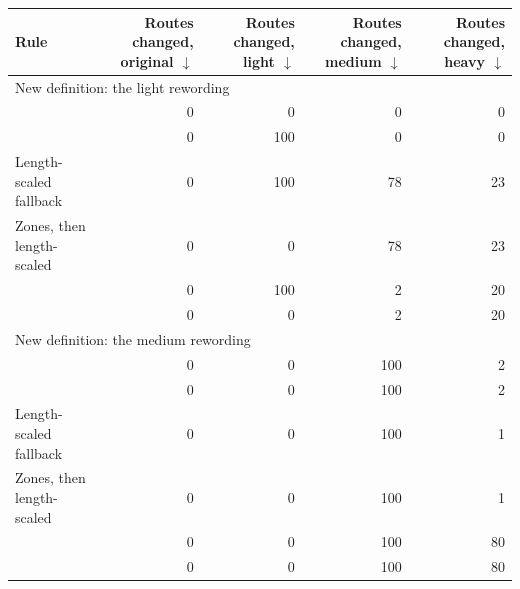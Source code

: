 \begin{tabular}{lrrrr}
    \toprule
    Rule & \shortstack[r]{Routes\\changed,\\original $\downarrow$} & \shortstack[r]{Routes\\changed,\\light $\downarrow$} & \shortstack[r]{Routes\\changed,\\medium $\downarrow$} & \shortstack[r]{Routes\\changed,\\heavy $\downarrow$} \\
    \midrule
    \multicolumn{5}{l}{New definition: the light rewording} \\
    \cert{} & 0 & 0 & 0 & 0 \\
    \nearest{} & 0 & 100 & 0 & 0 \\
    Length-scaled fallback & 0 & 100 & 78 & 23 \\
    Zones, then length-scaled & 0 & 0 & 78 & 23 \\
    \scaled{} & 0 & 100 & 2 & 20 \\
    \certscaled{} & 0 & 0 & 2 & 20 \\
    \midrule
    \multicolumn{5}{l}{New definition: the medium rewording} \\
    \cert{} & 0 & 0 & 100 & 2 \\
    \nearest{} & 0 & 0 & 100 & 2 \\
    Length-scaled fallback & 0 & 0 & 100 & 1 \\
    Zones, then length-scaled & 0 & 0 & 100 & 1 \\
    \scaled{} & 0 & 0 & 100 & 80 \\
    \certscaled{} & 0 & 0 & 100 & 80 \\
    \bottomrule
\end{tabular}
